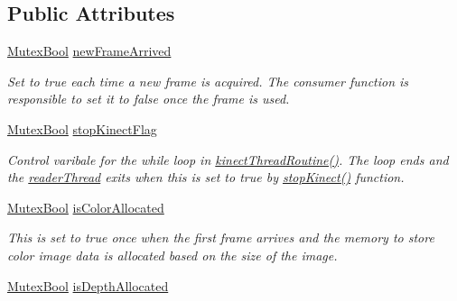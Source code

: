 \subsection*{Public Attributes}
\begin{DoxyCompactItemize}
\item 
\hypertarget{classpersonal_robotics_1_1_kinect_reader_a209d0248b8df3f39214a850dd2bd97bb}{}\hyperlink{classpersonal_robotics_1_1_mutex_type}{Mutex\+Bool} \hyperlink{classpersonal_robotics_1_1_kinect_reader_a209d0248b8df3f39214a850dd2bd97bb}{new\+Frame\+Arrived}\label{classpersonal_robotics_1_1_kinect_reader_a209d0248b8df3f39214a850dd2bd97bb}

\begin{DoxyCompactList}\small\item\em Set to true each time a new frame is acquired. The consumer function is responsible to set it to false once the frame is used. \end{DoxyCompactList}\item 
\hypertarget{classpersonal_robotics_1_1_kinect_reader_a9e443388b4e4bbbc5541f89d40a4c80e}{}\hyperlink{classpersonal_robotics_1_1_mutex_type}{Mutex\+Bool} \hyperlink{classpersonal_robotics_1_1_kinect_reader_a9e443388b4e4bbbc5541f89d40a4c80e}{stop\+Kinect\+Flag}\label{classpersonal_robotics_1_1_kinect_reader_a9e443388b4e4bbbc5541f89d40a4c80e}

\begin{DoxyCompactList}\small\item\em Control varibale for the while loop in \hyperlink{classpersonal_robotics_1_1_kinect_reader_a9263a03547aa8f9d401d3e2ad34f5e4f}{kinect\+Thread\+Routine()}. The loop ends and the \hyperlink{classpersonal_robotics_1_1_kinect_reader_afe24150fcff220507b3d9dcd9d0bee97}{reader\+Thread} exits when this is set to true by \hyperlink{classpersonal_robotics_1_1_kinect_reader_a40ee858f5274108e8b9ad4a13c14cbd2}{stop\+Kinect()} function. \end{DoxyCompactList}\item 
\hypertarget{classpersonal_robotics_1_1_kinect_reader_a88b3822051a0e9bfbcf119c67deda0ec}{}\hyperlink{classpersonal_robotics_1_1_mutex_type}{Mutex\+Bool} \hyperlink{classpersonal_robotics_1_1_kinect_reader_a88b3822051a0e9bfbcf119c67deda0ec}{is\+Color\+Allocated}\label{classpersonal_robotics_1_1_kinect_reader_a88b3822051a0e9bfbcf119c67deda0ec}

\begin{DoxyCompactList}\small\item\em This is set to true once when the first frame arrives and the memory to store color image data is allocated based on the size of the image. \end{DoxyCompactList}\item 
\hypertarget{classpersonal_robotics_1_1_kinect_reader_a2f7a2f527563a51aecc274d845345bfd}{}\hyperlink{classpersonal_robotics_1_1_mutex_type}{Mutex\+Bool} \hyperlink{classpersonal_robotics_1_1_kinect_reader_a2f7a2f527563a51aecc274d845345bfd}{is\+Depth\+Allocated}\label{classpersonal_robotics_1_1_kinect_reader_a2f7a2f527563a51aecc274d845345bfd}


\end{DoxyCompactItemize}
